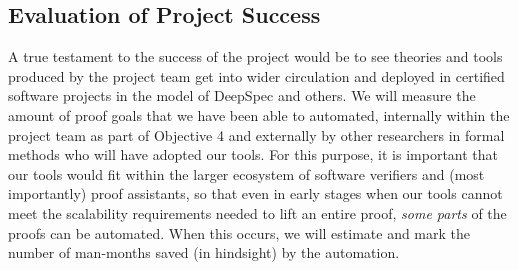 \subsection{Evaluation of Project Success}

A true testament to the success of the project would be to see theories and tools produced by the project team get into wider circulation and deployed in certified software projects in the model of DeepSpec and others.
We will measure the amount of proof goals that we have been able to automated, internally within the project team as part of Objective 4 and externally by other researchers in formal methods who will have adopted our tools.
For this purpose, it is important that our tools would fit within the larger ecosystem of software verifiers and (most importantly) proof assistants,
so that even in early stages when our tools cannot meet the scalability requirements needed to lift an entire proof,
\emph{some parts} of the proofs can be automated.
When this occurs, we will estimate and mark the number of man-months saved (in hindsight) by the automation.